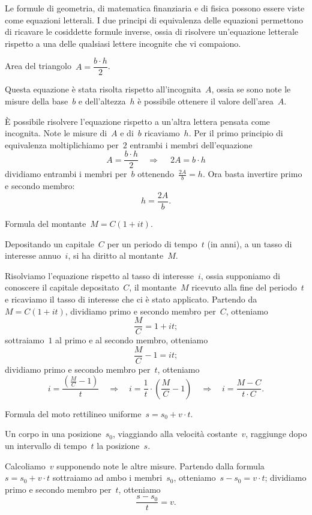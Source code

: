 Le formule di geometria, di matematica finanziaria e di fisica possono essere viste come equazioni letterali.
I due principi di equivalenza delle equazioni permettono di ricavare le cosiddette formule inverse, ossia di risolvere
un'equazione letterale rispetto a una delle qualsiasi lettere incognite che vi compaiono.
\begin{exrig}
 \begin{esempio}
Area del triangolo~$A=\dfrac{b\cdot h}{2}$.

Questa equazione è stata risolta rispetto all'incognita~$A$, ossia se sono note le misure della base~$b$ e dell'altezza~$h$
è possibile ottenere il valore dell'area~$A$.

È possibile risolvere l'equazione rispetto a un'altra lettera pensata come incognita.
Note le misure di~$A$ e di~$b$ ricaviamo~$h$. Per il primo principio di equivalenza moltiplichiamo per~$2$
entrambi i membri dell'equazione
\[A=\frac{b\cdot h}{2}\quad\Rightarrow\quad~2A=b\cdot h\]
dividiamo entrambi i membri per~$b$ ottenendo~$\frac{2A}{b}=h$.
Ora basta invertire primo e secondo membro: \[h=\frac{2A}{b}.\]
 \end{esempio}

 \begin{esempio}
Formula del montante~$M=C(1+it)$.

Depositando un capitale~$C$ per un periodo di tempo~$t$ (in anni), a un tasso di interesse annuo~$i$,
si ha diritto al montante~$M$.

Risolviamo l'equazione rispetto al tasso di interesse~$i$, ossia supponiamo di conoscere il capitale depositato~$C$, il montante~$M$
ricevuto alla fine del periodo~$t$ e ricaviamo il tasso di interesse che ci è stato applicato.
Partendo da~$M=C(1+it)$, dividiamo primo e secondo membro per~$C$, otteniamo \[\frac{M}{C}=1+it;\]
sottraiamo~$1$ al primo e al secondo membro, otteniamo
\[\frac{M}{C}-1=it;\] dividiamo primo e secondo membro per~$t$,
otteniamo
\[i=\frac{\left(\frac{M}{C}-1\right)}{t}\quad\Rightarrow\quad%
i=\frac{1}{t}\cdot \left(\frac{M}{C}-1\right)\quad\Rightarrow\quad i=\frac{M-C}{t\cdot C}.\]
 \end{esempio}

 \begin{esempio}
Formula del moto rettilineo uniforme~$s=s_{0}+v\cdot t$.

Un corpo in una posizione~$s_0$, viaggiando alla velocità costante~$v$, raggiunge dopo un intervallo di tempo~$t$ la posizione~$s$.

Calcoliamo~$v$ supponendo note le altre misure.
Partendo dalla formula~$s=s_{0}+v\cdot t$ sottraiamo ad ambo i membri~$s_0$, otteniamo~$s-s_{0}=v\cdot t$;
dividiamo primo e secondo membro per~$t$, otteniamo \[\frac{s-s_{0}}{t}=v.\]
 \end{esempio}

\end{exrig}

